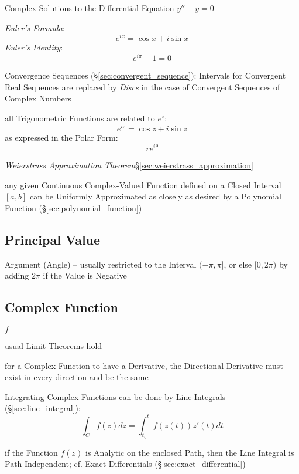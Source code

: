Complex Solutions to the Differential Equation $y'' + y = 0$

\emph{Euler's Formula}:
\[
  e^{ix} = \cos x + i \sin x
\]
\emph{Euler's Identity}:
\[
  e^{i\pi} + 1 = 0
\]

Convergence Sequences (\S\ref{sec:convergent_sequence}): Intervals
for Convergent Real Sequences are replaced by \emph{Discs} in the case of
Convergent Sequences of Complex Numbers

all Trigonometric Functions are related to $e^z$:
\[
  e^{iz} = \cos z + i \sin z
\]
as expressed in the Polar Form:
\[
  re^{i\theta}
\]


\emph{Weierstrass Approximation Theorem}\S\ref{sec:weierstrass_approximation}

any given Continuous Complex-Valued Function defined on a Closed Interval
$[a,b]$ can be Uniformly Approximated as closely as desired by a Polynomial
Function (\S\ref{sec:polynomial_function})



\subsection{Principal Value}\label{sec:principal_value}

Argument (Angle) -- usually restricted to the Interval $(-\pi,\pi]$, or else
$[0,2\pi)$ by adding $2\pi$ if the Value is Negative



\subsection{Complex Function}\label{sec:complex_function}

$f$

usual Limit Theorems hold

for a Complex Function to have a Derivative, the Directional Derivative must
exist in every direction and be the same

Integrating Complex Functions can be done by Line Integrals
(\S\ref{sec:line_integral}):
\[
  \int_{C} f(z) dz = \int_{t_0}^{t_1} f(z(t)) z'(t) dt
\]

if the Function $f(z)$ is Analytic on the enclosed Path, then the Line Integral
is Path Independent; cf. Exact Differentials (\S\ref{sec:exact_differential})

